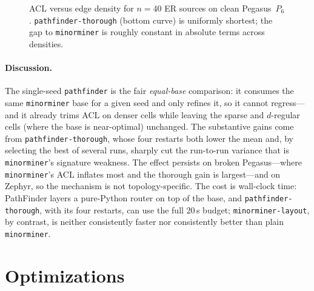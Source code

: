 \documentclass[acmsmall,anonymous,nonacm]{acmart}
\begin{document}
\begin{figure}[t]
\centering
{}
\caption{ACL versus edge density for $n{=}40$ ER sources on clean Pegasus~$P_6$.
\texttt{pathfinder-thorough} (bottom curve) is uniformly shortest; the gap to
\texttt{minorminer} is roughly constant in absolute terms across densities.}
\label{fig:density}
\end{figure}

\paragraph{Discussion.}
The single-seed \texttt{pathfinder} is the fair \emph{equal-base} comparison: it
consumes the same \texttt{minorminer} base for a given seed and only refines it,
so it cannot regress---and it already trims ACL on denser cells while leaving the
sparse and $d$-regular cells (where the base is near-optimal) unchanged. The
substantive gains come from \texttt{pathfinder-thorough}, whose four restarts
both lower the mean and, by selecting the best of several runs, sharply cut the
run-to-run variance that is \texttt{minorminer}'s signature weakness. The effect
persists on broken Pegasus---where \texttt{minorminer}'s ACL inflates most and the
thorough gain is largest---and on Zephyr, so the mechanism is not
topology-specific. The cost is wall-clock time: PathFinder layers a pure-Python
router on top of the base, and \texttt{pathfinder-thorough}, with its four
restarts, can use the full $20$\,s budget; \texttt{minorminer-layout}, by
contrast, is neither consistently faster nor consistently better than plain
\texttt{minorminer}.

\section{Optimizations}
\label{sec:optimizations}
\end{document}
